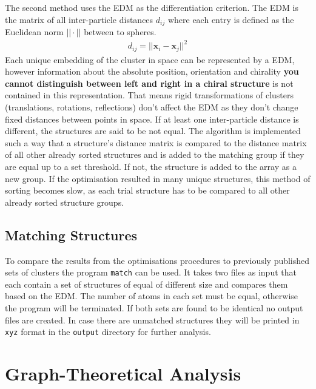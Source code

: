 The second method uses the \ac{EDM} as the differentiation criterion. The
\ac{EDM} is the matrix of all inter-particle distances $d_{ij}$ where
each entry is defined as the Euclidean norm $||\cdot||$ between to spheres.
%
\begin{align}
    d_{ij}=||\mathbf{x}_i-\mathbf{x}_j||^2
\end{align}
%
Each unique embedding of the cluster in space can be represented by a \ac{EDM},
however information about the absolute position, orientation and chirality {\bf you cannot distinguish between left and right in a chiral structure} is not contained
in this representation. That means rigid transformations of clusters
(translations, rotations, reflections) don't affect the \ac{EDM} as they don't
change fixed distances between points in
space.\autocite{Dokmanic_EuclideanDistanceMatrices_2015} If at least one
inter-particle distance is different, the structures are said to be not equal.
The algorithm is implemented such a way that a structure's distance matrix is
compared to the distance matrix of all other already sorted structures and is
added to the matching group if they are equal up to a set threshold. If not, the
structure is added to the array as a new group. If the optimisation resulted in
many unique structures, this method of sorting becomes slow, as each trial
structure has to be compared to all other already sorted structure groups.

\subsection{Matching Structures}
\label{sec:matchingstructures}

To compare the results from the optimisations procedures to previously
published sets of clusters the program \verb|match| can be used. It takes two
files as input that each contain a set of structures of equal of different size
and compares them based on the \ac{EDM}. The number of atoms in each set must
be equal, otherwise the program will be terminated. If both sets are found to
be identical no output files are created. In case there are unmatched
structures they will be printed in \verb|xyz| format in the \verb|output|
directory for further analysis.

\section{Graph-Theoretical Analysis}
\label{sec:GraphTheoreticalAnalysis}

